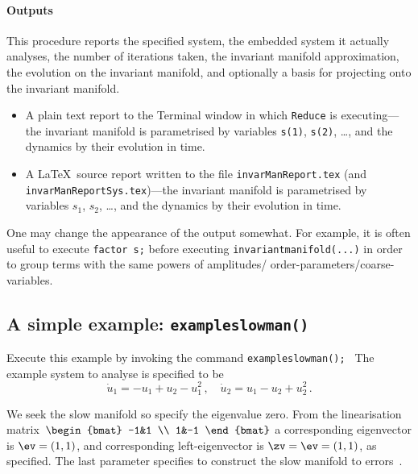 \documentclass[11pt,a5paper]{article}
\def\eps{\varepsilon}
\begin{document}
\paragraph{Outputs}  This procedure reports the specified
system, the embedded system it actually analyses, the number
of iterations taken, the invariant manifold approximation,
the evolution on the invariant manifold, and optionally a
basis for projecting onto the invariant manifold.
\begin{itemize}
\item A plain text report to the Terminal window in which
\verb|Reduce| is executing---the invariant manifold is
parametrised by variables \verb|s(1)|, \verb|s(2)|, \ldots,
and the dynamics by their evolution in time.
\item A \LaTeX\ source report written to the file
\verb|invarManReport.tex| (and
\verb|invarManReportSys.tex|)---the invariant manifold is
parametrised by variables \(s_1\), \(s_2\), \ldots, and the
dynamics by their evolution in time.
\end{itemize}
One may change the appearance of the output somewhat. For
example, it is often useful to execute  \verb|factor s;|
before executing \verb|invariantmanifold(...)| in order to
group terms with the same powers of amplitudes\slash
order-parameters\slash coarse-variables.



\subsection{A simple example: \texttt{exampleslowman()}} 
\label{ss:eg}
Execute this example by invoking the command
\verb|exampleslowman(); | The example system to analyse is
specified to be
\begin{equation*}
\dot u_1=-u_1+u_2-u_1^2\,, \quad \dot u_2=u_1-u_2+u_2^2\,.
\end{equation*}
We seek the slow manifold so specify the eigenvalue zero.
From the linearisation matrix~\(\begin{bmat} -1&1 \\ 1&-1
\end{bmat}\) a corresponding eigenvector is \(\ev=(1,1)\),
and corresponding left-eigenvector is \(\zv=\ev=(1,1)\), as
specified. The last parameter specifies to construct the
slow manifold to errors~\Ord{\eps^5}.
\end{document}
